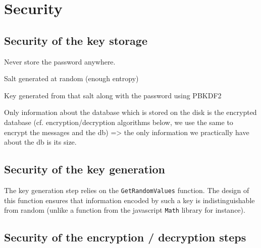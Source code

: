 \documentclass[10pt,twocolumn]{article}
\begin{document}
\section{Security}
\label{sec:security}

\subsection{Security of the key storage}



Never store the password anywhere.

Salt generated at random (enough entropy)

Key generated from that salt along with the password using PBKDF2

Only information about the database which is stored on the disk is the encrypted database (cf. encryption/decryption algorithms below, we use the same to encrypt the messages and the db) => the only information we practically have about the db is its size.




\subsection{Security of the key generation}

The key generation step relies on the \texttt{GetRandomValues} function. The design of this function ensures that information encoded by such a key is indistinguishable from random (unlike a function from the javascript \texttt{Math} library for instance).





\subsection{Security of the encryption / decryption steps}
\end{document}
